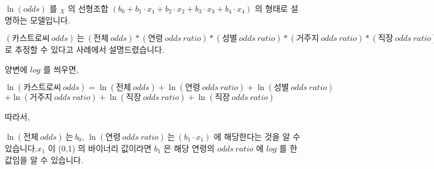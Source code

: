 \documentclass[letterpaper,10pt,english]{jupyterBook}
\begin{document}
\sphinxAtStartPar
\( \ln(odds) \) 를 \( _X \) 의 선형조합 \( (b_0 + b_1 \cdot x_1 + b_2 \cdot x_2 + b_3 \cdot x_3 + b_4  \cdot x_4) \)  의 형태로 설명하는 모델입니다.

\sphinxAtStartPar
\( (카스트로씨 \ odds) \ 는 \ (전체 \ odds) * (연령\ odds\ ratio) * (성별\ odds\ ratio) * (거주지\ odds\ ratio) * (직장\ odds\ ratio) \)로 추정할 수 있다고 사례에서 설명드렸습니다.

\sphinxAtStartPar
양변에 \(log\) 를 씌우면,

\sphinxAtStartPar
\( \ln(카스트로씨\ odds) = \ln(전체\ odds)  + \ln(연령\ odds\ ratio) + \ln(성별\ odds\ ratio)\)\( + \ln(거주지\ odds\ ratio) + \ln(직장\ odds\ ratio) + \ln(직장\ odds\ ratio) \)

\sphinxAtStartPar
따라서,

\sphinxAtStartPar
\( \ln(전체\ odds)\ 는 \ b_0 \),  \( \ln(연령\ odds\ ratio)\ 는\ (b_1 \cdot x_1) \) 에 해당한다는 것을 알 수 있습니다.\( x_1 \) 이 (0,1) 의 바이너리 값이라면 \( b_1 \) 은 해당 연령의 \( odds\ ratio \) 에 \( log \) 를 한 값임을 알 수 있습니다.









\renewcommand{\indexname}{Index}
\printindex
\end{document}
